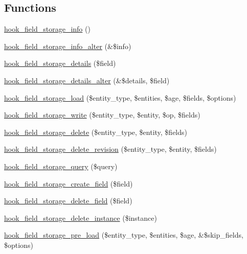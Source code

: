 \subsection*{Functions}
\begin{DoxyCompactItemize}
\item 
\hyperlink{group__field__storage_gadc5bfde3133504e946bb0aae8babe6f3}{hook\_\-field\_\-storage\_\-info} ()
\item 
\hyperlink{group__field__storage_ga98873f1aaac19188d739bf6cfcae468f}{hook\_\-field\_\-storage\_\-info\_\-alter} (\&\$info)
\item 
\hyperlink{group__field__storage_ga72b4d22502ffc709e50de0ba4f417062}{hook\_\-field\_\-storage\_\-details} (\$field)
\item 
\hyperlink{group__field__storage_gae79d6c32c896d3db208c90f3ab1b1ad0}{hook\_\-field\_\-storage\_\-details\_\-alter} (\&\$details, \$field)
\item 
\hyperlink{group__field__storage_gac9885dcd8f5d74b5f3137d7af40cf958}{hook\_\-field\_\-storage\_\-load} (\$entity\_\-type, \$entities, \$age, \$fields, \$options)
\item 
\hyperlink{group__field__storage_ga5663ebcfb92828cbed84a041e9a4b0d1}{hook\_\-field\_\-storage\_\-write} (\$entity\_\-type, \$entity, \$op, \$fields)
\item 
\hyperlink{group__field__storage_ga64bd5adc0e4ccc1fe52fbaabcfa10274}{hook\_\-field\_\-storage\_\-delete} (\$entity\_\-type, \$entity, \$fields)
\item 
\hyperlink{group__field__storage_ga74ff0893fd8d05ab372bd4b65d0ffc71}{hook\_\-field\_\-storage\_\-delete\_\-revision} (\$entity\_\-type, \$entity, \$fields)
\item 
\hyperlink{group__field__storage_gaf46795ee1b678a72b4457b524303c794}{hook\_\-field\_\-storage\_\-query} (\$query)
\item 
\hyperlink{group__field__storage_gac345df04a43f63941dd69c7d18e83e00}{hook\_\-field\_\-storage\_\-create\_\-field} (\$field)
\item 
\hyperlink{group__field__storage_ga2102841b167285acf3f0e4e9f854440d}{hook\_\-field\_\-storage\_\-delete\_\-field} (\$field)
\item 
\hyperlink{group__field__storage_ga509e10cbd2900c13ab7269f1740a36f7}{hook\_\-field\_\-storage\_\-delete\_\-instance} (\$instance)
\item 
\hyperlink{group__field__storage_ga3ecb0f31afe3c91eb5ab58bfba4d33fb}{hook\_\-field\_\-storage\_\-pre\_\-load} (\$entity\_\-type, \$entities, \$age, \&\$skip\_\-fields, \$options)

\end{DoxyCompactItemize}
